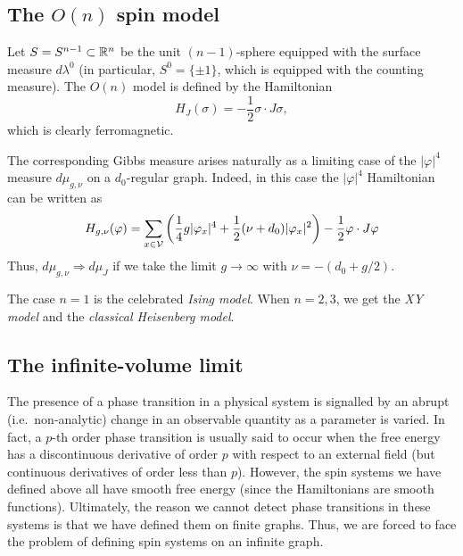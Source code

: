 
\subsection{The \texorpdfstring{$O(n)$}{O(n)} spin model}

Let $S = S^{n-1} \subset {\mathbb R}^n$ be the unit $(n-1)$-sphere equipped with the surface measure $d\lambda^0$ (in particular, $S^0 = \{ \pm 1 \}$, which is equipped with the counting measure). The $O(n)$ model is defined by the Hamiltonian
\begin{equation}
H_J(\sigma) = -\frac{1}{2} \sigma \cdot J \sigma,
\end{equation}
which is clearly ferromagnetic.

The corresponding Gibbs measure arises naturally as a limiting case of the
$|\varphi|^4$ measure $d\mu_{g,\nu}$ on a $d_0$-regular graph. Indeed, in this case the $|\varphi|^4$ Hamiltonian can be written as
\begin{equation}
H_{g,\nu}(\varphi)
  =
\sum_{x\in\mathcal{V}}
\left(
  \frac{1}{4} g |\varphi_x|^4
    +
  \frac{1}{2} (\nu + d_0) |\varphi_x|^2
\right)
  -
\frac{1}{2} \varphi \cdot J \varphi
\end{equation}
Thus, $d\mu_{g,\nu} \Rightarrow d\mu_J$ if we take the limit $g\to\infty$ with $\nu = -(d_0 + g / 2)$.

The case $n = 1$ is the celebrated \emph{Ising model}. When $n = 2, 3$, we get the \emph{XY model} and the \emph{classical Heisenberg model}.


\subsection{The infinite-volume limit}

The presence of a phase transition in a physical system is signalled by an abrupt (i.e.\ non-analytic) change in an observable quantity as a parameter is varied. In fact, a $p$-th order phase transition is usually said to occur when the free energy has a discontinuous derivative of order $p$ with respect to an external field (but continuous derivatives of order less than $p$). However, the spin systems we have defined above all have smooth free energy (since the Hamiltonians are smooth functions). Ultimately, the reason we cannot detect phase transitions in these systems is that we have defined them on finite graphs. Thus, we are forced to face the problem of defining spin systems on an infinite graph.

